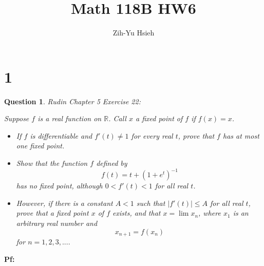 \documentclass{article}
\title{Math 118B HW6}
\author{Zih-Yu Hsieh}
\newtheorem{question}{Question}
\begin{document}
\maketitle

\section*{1}
\begin{myBox}[]{}
    \begin{question}
        Rudin Chapter 5 Exercise 22:

        Suppose $f$ is a real function on $\mathbb{R}$. Call $x$ a \textit{fixed point} of $f$ if $f(x)=x$.
        \begin{itemize}
            \item[(a)] If $f$ is differentiable and $f'(t)\neq 1$ for every real $t$, prove that $f$ has at most one fixed point.
            \item[(b)] Show that the function $f$ defined by 
            $$f(t)=t+(1+e^t)^{-1}$$
            has no fixed point, although $0<f'(t)<1$ for all real $t$.
            \item[(c)] However, if there is a constant $A<1$ such that $|f'(t)|\leq A$ for all real $t$, prove that a fixed point $x$ of $f$ exists,
            and that $x=\lim x_n$, where $x_1$ is an arbitrary real number and
            $$x_{n+1}=f(x_n)$$
            for $n=1,2,3,....$
        \end{itemize}
    \end{question}
\end{myBox}

\textbf{Pf:}
\end{document}
